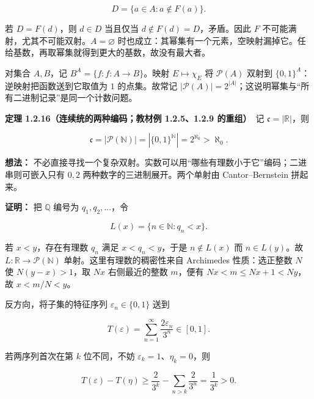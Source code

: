 \documentclass[11pt,a4paper]{article}
\begin{document}
\begin{equation*}
D=\{a\in A:a\notin F(a)\}.
\tag{1.2.14}
\end{equation*}

若 \(D=F(d)\)，则 \(d\in D\) 当且仅当 \(d\notin F(d)=D\)，矛盾。因此
\(F\) 不可能满射，尤其不可能双射。\(A=\varnothing\)
时也成立：其幂集有一个元素，空映射漏掉它。任给基数，再取幂集就得到更大的基数，故没有最大者。

对集合 \(A,B\)，记 \(B^A=\{f:f:A\to B\}\)。映射 \(E\mapsto\chi_E\) 将
\(\mathcal P(A)\) 双射到 \(\{0,1\}^A\)：逆映射把函数送到它取值为 \(1\)
的点集。故常记
\(|\mathcal P(A)|=2^{|A|}\)；这说明幂集与``所有二进制记录''是同一个计数问题。

\textbf{定理 1.2.16（连续统的两种编码；教材例 1.2.5、1.2.9 的重组）}　记
\(\mathfrak c=|\mathbb R|\)，则

\begin{equation*}
\mathfrak c=|\mathcal P(\mathbb N)|=|\{0,1\}^{\mathbb N}|=2^{\aleph_0}>\aleph_0.
\tag{1.2.15}
\end{equation*}

\textbf{想法：}
不必直接寻找一个复杂双射。实数可以用``哪些有理数小于它''编码；二进串则可嵌入只有
\(0,2\) 两种数字的三进制展开。两个单射由 Cantor--Bernstein 拼起来。

\textbf{证明：} 把 \(\mathbb Q\) 编号为 \(q_1,q_2,\ldots\)，令

\begin{equation*}
L(x)=\{n\in\mathbb N:q_n<x\}.
\tag{1.2.16}
\end{equation*}

若 \(x<y\)，存在有理数 \(q_n\) 满足 \(x<q_n<y\)，于是 \(n\notin L(x)\)
而 \(n\in L(y)\)。故 \(L:\mathbb R\to\mathcal P(\mathbb N)\)
单射。这里有理数的稠密性来自 Archimedes 性质：选正整数 \(N\) 使
\(N(y-x)>1\)，取 \(Nx\) 右侧最近的整数 \(m\)，便有
\(Nx<m\le Nx+1<Ny\)，故 \(x<m/N<y\)。

反方向，将子集的特征序列 \(\varepsilon_n\in\{0,1\}\) 送到

\begin{equation*}
T(\varepsilon)=\sum_{n=1}^{\infty}\frac{2\varepsilon_n}{3^n}\in[0,1].
\tag{1.2.17}
\end{equation*}

若两序列首次在第 \(k\) 位不同，不妨
\(\varepsilon_k=1\)、\(\eta_k=0\)，则

\begin{equation*}
T(\varepsilon)-T(\eta)
\ge\frac{2}{3^k}-\sum_{n>k}\frac{2}{3^n}
=\frac{1}{3^k}>0.
\tag{1.2.18}
\end{equation*}
\end{document}
